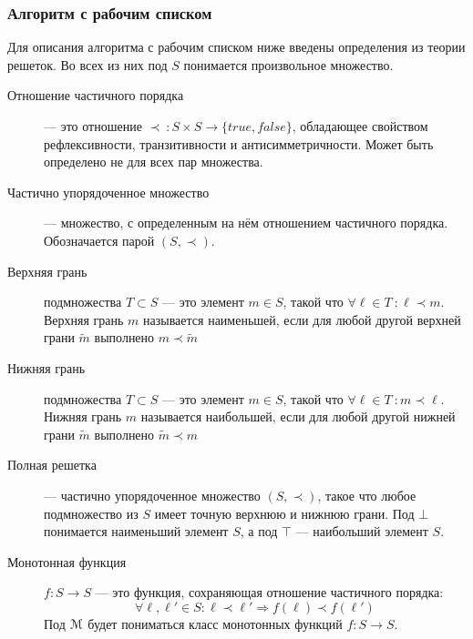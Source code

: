 \subsubsection{Алгоритм с рабочим списком}%
\label{sec:workList}
Для описания алгоритма с рабочим списком ниже введены определения из
теории решеток. Во всех из них под $S$ понимается произвольное
множество.
\begin{center}
    \begin{description}
      \item[Отношение частичного порядка] --- это отношение $\prec\::
	S \times S \rightarrow \{true, false\}$, обладающее свойством
	рефлексивности, транзитивности и антисимметричности. Может быть
	определено не для всех пар множества.

      \item[Частично упорядоченное множество] --- множество, с
	определенным на нём отношением частичного порядка. Обозначается
	парой $\left( S, \prec \right)$.

      \item[Верхняя грань] подмножества $T \subset S$ --- это элемент $
	m \in S$, такой что
	$
	\forall \ell \in T\:: \ell \prec m
	$.
	Верхняя грань $m$ называется наименьшей, если для любой другой
	верхней грани $\tilde{m}$ выполнено 
	$
	m \prec \tilde{m}
	$

      \item[Нижняя грань] подмножества $T \subset S$ --- это элемент $
	m \in S$, такой что
	$
	\forall \ell \in T\:: m \prec \ell
	$.
	Нижняя грань $m$ называется наибольшей, если для любой другой
	нижней грани $\tilde{m}$ выполнено 
	$
	\tilde{m} \prec m
	$

      \item[Полная решетка] --- частично упорядоченное множество $(S,
	\prec)$, такое что любое подмножество из $S$ имеет точную
	верхнюю и нижнюю грани. Под $\bot$ понимается наименьший
	элемент $S$, а под $\top$ --- наибольший элемент $S$.

      \item[Монотонная функция] $f: S \rightarrow S$ --- это функция,
	сохраняющая отношение частичного порядка:
	\[
	\forall \ell, \ell' \in S: \ell \prec \ell' \Rightarrow
	f\left( \ell \right) \prec f\left( \ell' \right)
	\]
	Под $\EuScript{M}$ будет пониматься класс монотонных функций $f: S
	\rightarrow S$.


\end{description}
\end{center}
